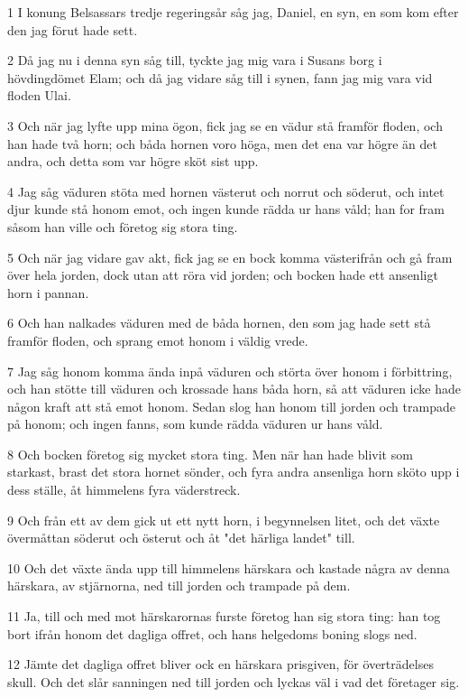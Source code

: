 \par 1 I konung Belsassars tredje regeringsår såg jag, Daniel, en syn, en som kom efter den jag förut hade sett.
\par 2 Då jag nu i denna syn såg till, tyckte jag mig vara i Susans borg i hövdingdömet Elam; och då jag vidare såg till i synen, fann jag mig vara vid floden Ulai.
\par 3 Och när jag lyfte upp mina ögon, fick jag se en vädur stå framför floden, och han hade två horn; och båda hornen voro höga, men det ena var högre än det andra, och detta som var högre sköt sist upp.
\par 4 Jag såg väduren stöta med hornen västerut och norrut och söderut, och intet djur kunde stå honom emot, och ingen kunde rädda ur hans våld; han for fram såsom han ville och företog sig stora ting.
\par 5 Och när jag vidare gav akt, fick jag se en bock komma västerifrån och gå fram över hela jorden, dock utan att röra vid jorden; och bocken hade ett ansenligt horn i pannan.
\par 6 Och han nalkades väduren med de båda hornen, den som jag hade sett stå framför floden, och sprang emot honom i väldig vrede.
\par 7 Jag såg honom komma ända inpå väduren och störta över honom i förbittring, och han stötte till väduren och krossade hans båda horn, så att väduren icke hade någon kraft att stå emot honom. Sedan slog han honom till jorden och trampade på honom; och ingen fanns, som kunde rädda väduren ur hans våld.
\par 8 Och bocken företog sig mycket stora ting. Men när han hade blivit som starkast, brast det stora hornet sönder, och fyra andra ansenliga horn sköto upp i dess ställe, åt himmelens fyra väderstreck.
\par 9 Och från ett av dem gick ut ett nytt horn, i begynnelsen litet, och det växte övermåttan söderut och österut och åt "det härliga landet" till.
\par 10 Och det växte ända upp till himmelens härskara och kastade några av denna härskara, av stjärnorna, ned till jorden och trampade på dem.
\par 11 Ja, till och med mot härskarornas furste företog han sig stora ting: han tog bort ifrån honom det dagliga offret, och hans helgedoms boning slogs ned.
\par 12 Jämte det dagliga offret bliver ock en härskara prisgiven, för överträdelses skull. Och det slår sanningen ned till jorden och lyckas väl i vad det företager sig.
